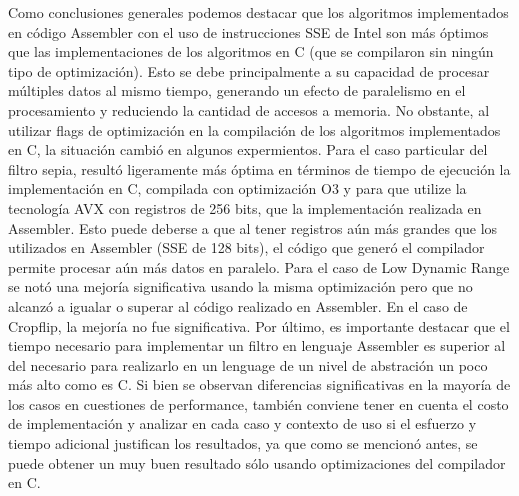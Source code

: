 \documentclass[a4paper]{article}
\begin{document}
Como conclusiones generales podemos destacar que los algoritmos implementados
en código Assembler con el uso de instrucciones SSE de Intel son más óptimos que
las implementaciones de los algoritmos en C (que se compilaron sin ningún
tipo de optimización). Esto se debe principalmente a
su capacidad de procesar múltiples datos al mismo tiempo, generando un efecto
de paralelismo en el procesamiento y reduciendo la cantidad de accesos a memoria.
No obstante, al utilizar flags de optimización en la compilación de los algoritmos
implementados en C, la situación cambió en algunos expermientos. Para el caso particular
del filtro sepia, resultó ligeramente más óptima en términos de tiempo de ejecución
la implementación en C, compilada con optimización O3 y para que utilize la tecnología
AVX con registros de 256 bits, que la implementación realizada en Assembler. Esto puede deberse
a que al tener registros aún más grandes que los utilizados en Assembler (SSE de 128 bits),
el código que generó el compilador permite procesar aún más datos en paralelo.
Para el caso de Low Dynamic Range se notó una mejoría significativa usando la misma optimización
pero que no alcanzó a igualar o superar al código realizado en Assembler. En el caso de Cropflip, la mejoría no fue significativa.
Por último, es importante destacar que el tiempo necesario para implementar un filtro en lenguaje
Assembler es superior al del necesario para realizarlo en un lenguage de un nivel de abstración
un poco más alto como es C. Si bien se observan diferencias significativas en la mayoría de los
casos en cuestiones de performance, también conviene tener en cuenta el costo de implementación y
analizar en cada caso y contexto de uso si el esfuerzo y tiempo adicional justifican los resultados,
ya que como se mencionó antes, se puede obtener un muy buen resultado sólo usando optimizaciones del compilador en C.
\end{document}
